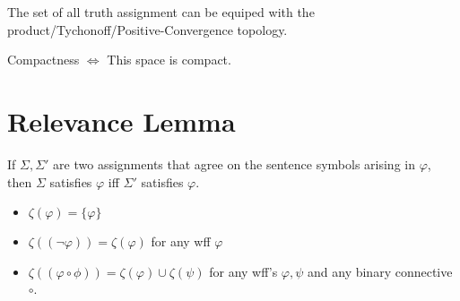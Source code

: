 \documentclass[11pt]{article}
\begin{document}
	The set of all truth assignment can be equiped with the product/Tychonoff/Positive-Convergence topology.
	
	Compactness $\Leftrightarrow$ This space is compact.
	
	\section{Relevance Lemma}
	
	If $\Sigma, \Sigma'$ are two assignments that agree on the sentence symbols arising in $\varphi$, then $\Sigma$ satisfies $\varphi$ iff $\Sigma'$ satisfies $\varphi$.
	
	\begin{definition}
		\begin{itemize}
			\item $\zeta(\varphi) = \{\varphi\}$
			\item $\zeta((\neg \varphi)) = \zeta(\varphi)$ for any wff $\varphi$
			\item $\zeta((\varphi \circ \phi)) = \zeta(\varphi) \cup \zeta(\psi)$ for any wff's $\varphi, \psi$ and any binary connective $\circ$.
		\end{itemize}
	\end{definition}
\end{document}
